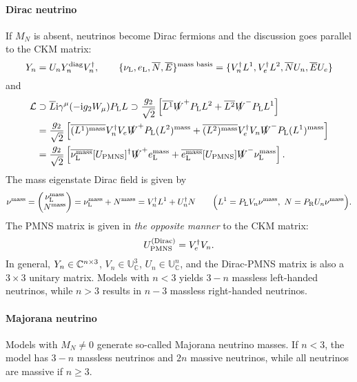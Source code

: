 \documentclass[CheatSheet]{subfiles}
\newcommand\MN[1][]{M_{N#1}}
\begin{document}
\paragraph{Dirac neutrino}
If $\MN$ is absent, neutrinos become Dirac fermions and the discussion goes parallel to the CKM matrix:
\begin{equation}
 Y_{n} = U_n Y_n^{\text{diag}} V_n^\dagger,\qquad
\{\nu_{\mathrm{L}}, e_{\mathrm{L}}, \overline N, \overline E\}^{\text{mass basis}} = \{V_n^\dagger L^1, V_e^\dagger L^2, \overline N U_n, \overline E U_e\}
\end{equation}
and
\begin{align}
 \mathcal L&\supset\overline{L}\mathrm{i}\gamma^\mu(-\mathrm{i} g_2 W_\mu)P_{\mathrm{L}} L
\supset
\frac{g_2}{\sqrt2}\left[
\overline{L^1} \slashed W^+P_{\mathrm{L}} L^2
+\overline{L^2}\slashed W^-P_{\mathrm{L}} L^1
\right]
\\&=
\frac{g_2}{\sqrt2}\left[
\overline{(L^1)^{\text{mass}}} V_n^\dagger V_e\slashed W^+P_{\mathrm{L}} (L^2)^{\text{mass}}
+\overline{(L^2)^{\text{mass}}}V_e^\dagger V_n\slashed W^-P_{\mathrm{L}}(L^1)^{\text{mass}}
\right]
\\&=
\frac{g_2}{\sqrt2}\left[
\overline{\nu_{\mathrm{L}}^{\text{mass}}} [U_{\mathrm{PMNS}}]^\dagger\slashed W^+e_{\mathrm{L}}^{\text{mass}}
+\overline{e_{\mathrm{L}}^{\text{mass}}}[U_{\mathrm{PMNS}}] \slashed W^-\nu_{\mathrm{L}}^{\text{mass}}
\right].
\end{align}
The mass eigenstate Dirac field is given by
\begin{equation}
 \nu^{\text{mass}} = \begin{pmatrix}\nu_{\mathrm{L}}^{\text{mass}}\\N^{\text{mass}}\end{pmatrix} = 
\nu_{\mathrm{L}}^{\text{mass}}+N^{\text{mass}}=
V_n^\dagger L^1 + U_n^\dagger N
\qquad
 \Bigl(L^1 = P_{\mathrm{L}} V_n \nu^{\text{mass}},~
 N = P_{\mathrm{R}} U_n \nu^{\text{mass}}\Bigr).
\end{equation}
The PMNS matrix is given in \emph{the opposite manner} to the CKM matrix:
\begin{equation}
 U_{\mathrm{PMNS}}^{\text{(Dirac)}}=V_e^\dagger V_n.
\end{equation}
In general, $Y_{n}\in\mathbb C^{n\times3}$, $V_n\in\mathbb U_{\mathbb C}^3$, $U_n\in\mathbb U_{\mathbb C}^n$, and the Dirac-PMNS matrix is also a $3\times 3$ unitary matrix.
Models with $n<3$ yields $3-n$ massless left-handed neutrinos, while $n>3$ results in $n-3$ massless right-handed neutrinos.


\paragraph{Majorana neutrino}
Models with $\MN\neq0$ generate so-called Majorana neutrino masses.
If $n<3$, the model has $3-n$ massless neutrinos and $2n$ massive neutrinos, while all neutrinos are massive if $n\ge 3$.
\end{document}
